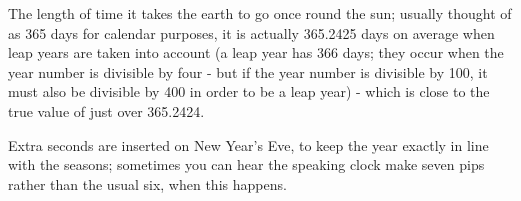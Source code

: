 The length of time it takes the earth to go once round the sun;
usually thought of as 365 days for calendar purposes, it is actually
365.2425 days on average when leap years are taken into account
(a leap year has 366 days; they occur when the year number is
divisible by four - but if the year number is divisible by 100, it
must also be divisible by 400 in order to be a leap year) - which
is close to the true value of just over 365.2424.
\par
Extra seconds are inserted on New Year's Eve, to keep the year
exactly in line with the seasons; sometimes you can hear the speaking
clock make seven pips rather than the usual six, when this happens.